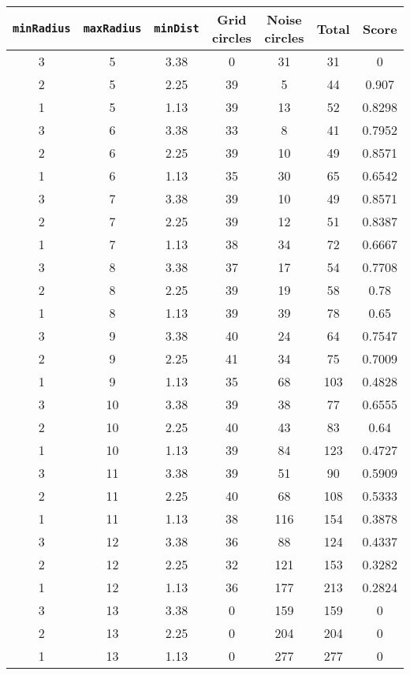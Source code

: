 \documentclass[letterpaper, 12pt]{article}
\begin{document}
\begin{longtable}{|c|c|c|c|c|c|c|}
\hline
\textbf{\texttt{minRadius}} & \textbf{\texttt{maxRadius}} & \textbf{\texttt{minDist}} & \textbf{Grid circles} & \textbf{Noise circles} & \textbf{Total} & \textbf{Score} \\
\hline
3 & 5 & 3.38 & 0 & 31 & 31 & 0 \\
\hline
2 & 5 & 2.25 & 39 & 5 & 44 & 0.907 \\
\hline
1 & 5 & 1.13 & 39 & 13 & 52 & 0.8298 \\
\hline
3 & 6 & 3.38 & 33 & 8 & 41 & 0.7952 \\
\hline
2 & 6 & 2.25 & 39 & 10 & 49 & 0.8571 \\
\hline
1 & 6 & 1.13 & 35 & 30 & 65 & 0.6542 \\
\hline
3 & 7 & 3.38 & 39 & 10 & 49 & 0.8571 \\
\hline
2 & 7 & 2.25 & 39 & 12 & 51 & 0.8387 \\
\hline
1 & 7 & 1.13 & 38 & 34 & 72 & 0.6667 \\
\hline
3 & 8 & 3.38 & 37 & 17 & 54 & 0.7708 \\
\hline
2 & 8 & 2.25 & 39 & 19 & 58 & 0.78 \\
\hline
1 & 8 & 1.13 & 39 & 39 & 78 & 0.65 \\
\hline
3 & 9 & 3.38 & 40 & 24 & 64 & 0.7547 \\
\hline
2 & 9 & 2.25 & 41 & 34 & 75 & 0.7009 \\
\hline
1 & 9 & 1.13 & 35 & 68 & 103 & 0.4828 \\
\hline
3 & 10 & 3.38 & 39 & 38 & 77 & 0.6555 \\
\hline
2 & 10 & 2.25 & 40 & 43 & 83 & 0.64 \\
\hline
1 & 10 & 1.13 & 39 & 84 & 123 & 0.4727 \\
\hline
3 & 11 & 3.38 & 39 & 51 & 90 & 0.5909 \\
\hline
2 & 11 & 2.25 & 40 & 68 & 108 & 0.5333 \\
\hline
1 & 11 & 1.13 & 38 & 116 & 154 & 0.3878 \\
\hline
3 & 12 & 3.38 & 36 & 88 & 124 & 0.4337 \\
\hline
2 & 12 & 2.25 & 32 & 121 & 153 & 0.3282 \\
\hline
1 & 12 & 1.13 & 36 & 177 & 213 & 0.2824 \\
\hline
3 & 13 & 3.38 & 0 & 159 & 159 & 0 \\
\hline
2 & 13 & 2.25 & 0 & 204 & 204 & 0 \\
\hline
1 & 13 & 1.13 & 0 & 277 & 277 & 0 \\

\end{longtable}
\end{document}
